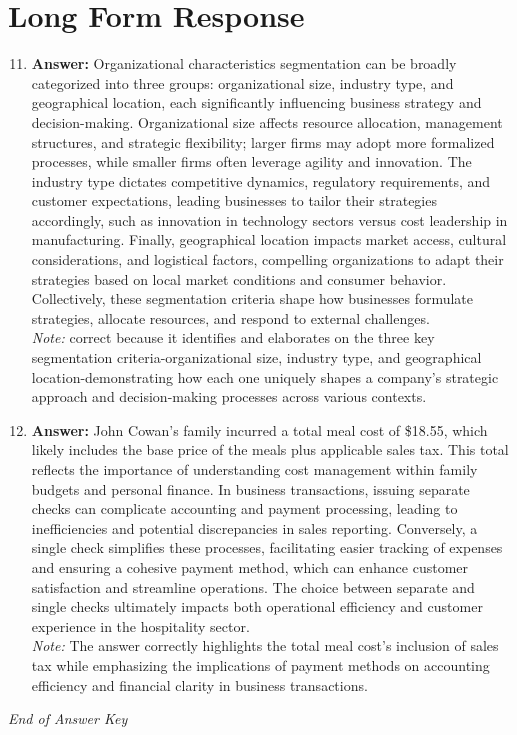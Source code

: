 \documentclass[12pt]{article}
\begin{document}
\section*{Long Form Response}
\begin{enumerate}[label=\arabic*.]
\setcounter{enumi}{10}
\item \textbf{Answer:} Organizational characteristics segmentation can be broadly categorized into three groups: organizational size, industry type, and geographical location, each significantly influencing business strategy and decision-making. Organizational size affects resource allocation, management structures, and strategic flexibility; larger firms may adopt more formalized processes, while smaller firms often leverage agility and innovation. The industry type dictates competitive dynamics, regulatory requirements, and customer expectations, leading businesses to tailor their strategies accordingly, such as innovation in technology sectors versus cost leadership in manufacturing. Finally, geographical location impacts market access, cultural considerations, and logistical factors, compelling organizations to adapt their strategies based on local market conditions and consumer behavior. Collectively, these segmentation criteria shape how businesses formulate strategies, allocate resources, and respond to external challenges.
\\ \textit{Note:} correct because it identifies and elaborates on the three key segmentation criteria-organizational size, industry type, and geographical location-demonstrating how each one uniquely shapes a company's strategic approach and decision-making processes across various contexts.
\item \textbf{Answer:} John Cowan's family incurred a total meal cost of \$18.55, which likely includes the base price of the meals plus applicable sales tax. This total reflects the importance of understanding cost management within family budgets and personal finance. In business transactions, issuing separate checks can complicate accounting and payment processing, leading to inefficiencies and potential discrepancies in sales reporting. Conversely, a single check simplifies these processes, facilitating easier tracking of expenses and ensuring a cohesive payment method, which can enhance customer satisfaction and streamline operations. The choice between separate and single checks ultimately impacts both operational efficiency and customer experience in the hospitality sector.
\\ \textit{Note:} The answer correctly highlights the total meal cost's inclusion of sales tax while emphasizing the implications of payment methods on accounting efficiency and financial clarity in business transactions.
\end{enumerate}

\vfill
\noindent\textit{End of Answer Key}
\end{document}
